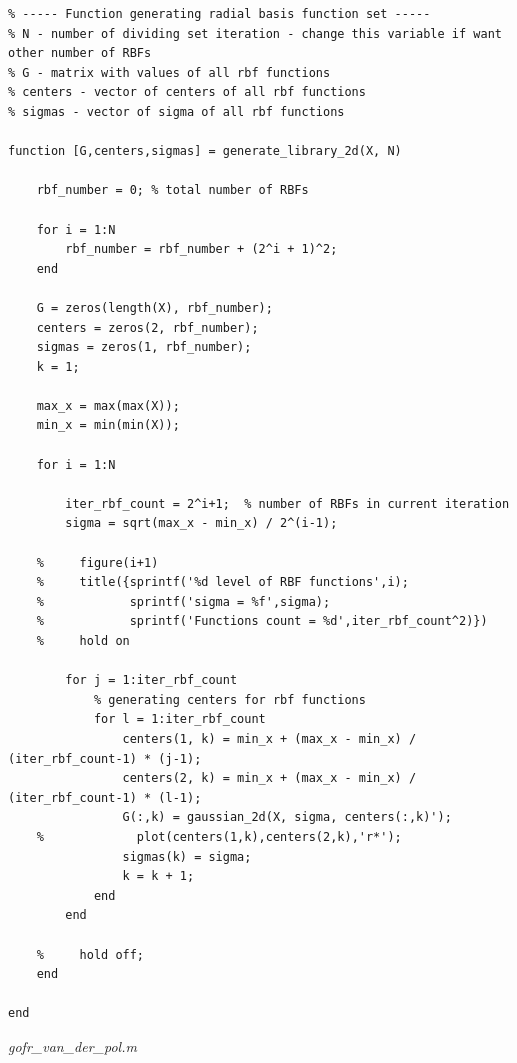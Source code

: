 \begin{lstlisting}
% ----- Function generating radial basis function set -----
% N - number of dividing set iteration - change this variable if want other number of RBFs
% G - matrix with values of all rbf functions
% centers - vector of centers of all rbf functions
% sigmas - vector of sigma of all rbf functions

function [G,centers,sigmas] = generate_library_2d(X, N)

    rbf_number = 0; % total number of RBFs

    for i = 1:N
        rbf_number = rbf_number + (2^i + 1)^2;
    end

    G = zeros(length(X), rbf_number);
    centers = zeros(2, rbf_number);
    sigmas = zeros(1, rbf_number);
    k = 1;

    max_x = max(max(X));
    min_x = min(min(X));

    for i = 1:N

        iter_rbf_count = 2^i+1;  % number of RBFs in current iteration
        sigma = sqrt(max_x - min_x) / 2^(i-1);

    %     figure(i+1)
    %     title({sprintf('%d level of RBF functions',i);
    %            sprintf('sigma = %f',sigma);
    %            sprintf('Functions count = %d',iter_rbf_count^2)})
    %     hold on

        for j = 1:iter_rbf_count
            % generating centers for rbf functions
            for l = 1:iter_rbf_count
                centers(1, k) = min_x + (max_x - min_x) / (iter_rbf_count-1) * (j-1);
                centers(2, k) = min_x + (max_x - min_x) / (iter_rbf_count-1) * (l-1);
                G(:,k) = gaussian_2d(X, sigma, centers(:,k)'); 
    %             plot(centers(1,k),centers(2,k),'r*');
                sigmas(k) = sigma;
                k = k + 1;
            end
        end    

    %     hold off;
    end

end
\end{lstlisting}

\textit{gofr\_van\_der\_pol.m}

